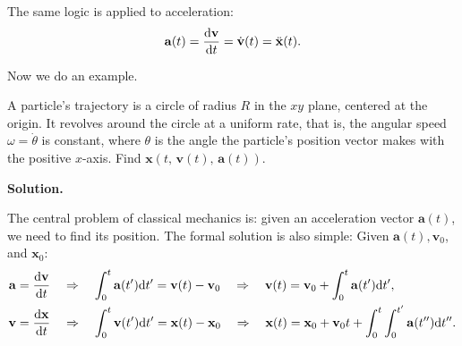 \documentclass[10pt]{article}
\begin{document}
	The same logic is applied to acceleration:
	\begin{equation}
	  \mathbf{a}(t) = \dv{\mathbf{v}}{t} = \dot{\mathbf{v}}(t) = \ddot{\mathbf{x}}(t).
	\end{equation}

	Now we do an example. 
	\begin{exercise}
		A particle's trajectory is a circle of radius $R$ in the $xy$ plane, centered at the origin. It revolves around the circle at a uniform rate, that is, the angular speed $\omega = \dot{\theta}$ is constant, where $\theta$ is the angle the particle's position vector makes with the positive $x$-axis. Find $\mathbf{x}(t,\,\mathbf{v}(t),\,\mathbf{a}(t))$.

		\vspace{1\baselineskip}
		\textbf{Solution.} 
	\end{exercise}

	The central problem of classical mechanics is: given an acceleration vector $\mathbf{a}(t)$, we need to find its position. The formal solution is also simple: Given $\mathbf{a}(t), \mathbf{v}_{0}$, and $\mathbf{x}_{0}$:
	\begin{equation}
	  \begin{aligned}
	  \mathbf{a} &= \dv{\mathbf{v}}{t} \quad \Rightarrow \quad \int_{0}^{t} \mathbf{a}(t')\dd t' = \mathbf{v}(t) - \mathbf{v}_{0} \quad \Rightarrow \quad \mathbf{v}(t) = \mathbf{v}_{0} + \int_{0}^{t} \mathbf{a}(t')\dd t',\\
	  \mathbf{v} &= \dv{\mathbf{x}}{t} \quad \Rightarrow \quad \int_{0}^{t} \mathbf{v}(t')\dd t' = \mathbf{x}(t) - \mathbf{x}_{0} \quad \Rightarrow \quad \mathbf{x}(t) = \mathbf{x}_{0} + \mathbf{v}_{0}t + \int_{0}^{t}\int_{0}^{t'}\mathbf{a}(t'')\dd t''.
	  \end{aligned}
	\end{equation}
\end{document}
